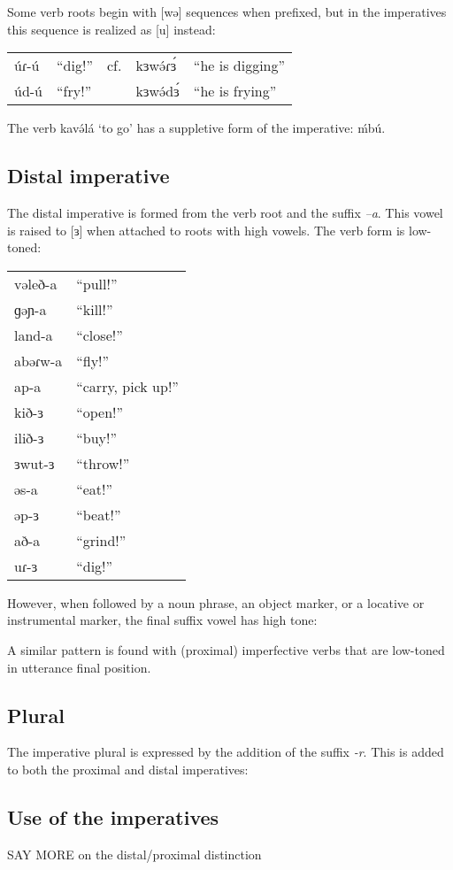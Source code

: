 Some verb roots begin with [wə] sequences when prefixed, but in the imperatives this sequence is realized as [u] instead:

\begin{tabular}[t]{lllll}
úɾ-ú	&	“dig!”  &	 cf.&	kɜwə́ɾɜ́	&	“he is digging”\\
úd-ú 	&	“fry!”	&		&	kɜwə́dɜ́	&	“he is frying”\\
\end{tabular}


The verb kavə́lá ‘to go’ has a suppletive form of the imperative: ḿbú. 

\subsection{Distal imperative}
The distal imperative is formed from the verb root and the suffix \textit{–a}. This vowel is raised to [ɜ] when attached to roots with high vowels. The verb form is low-toned:

\ea
\begin{tabular}[t]{ll}
vəleð-a	&	“pull!”\\
ɡəɲ-a	&	“kill!”\\
land-a	&	“close!”\\
abəɾw-a	&	“fly!”\\
ap-a	&	“carry, pick up!”\\
kið-ɜ	&	“open!”\\
ilið-ɜ	&	“buy!”\\
ɜwut-ɜ	&	“throw!”\\
əs-a	&	“eat!”\\
əp-ɜ	&	“beat!”\\
að-a	&	“grind!”\\
uɾ-ɜ	&	“dig!” \\
\end{tabular}
\z

However, when followed by a noun phrase, an object marker, or a locative or instrumental marker, the final suffix vowel has high tone:


A similar pattern is found with (proximal) imperfective verbs that are low-toned in utterance final position. 

\subsection{Plural}
The imperative plural is expressed by the addition of the suffix \textit{-r}. This is added to both the proximal and distal imperatives:


\subsection{Use of the imperatives}
SAY MORE on the distal/proximal distinction
